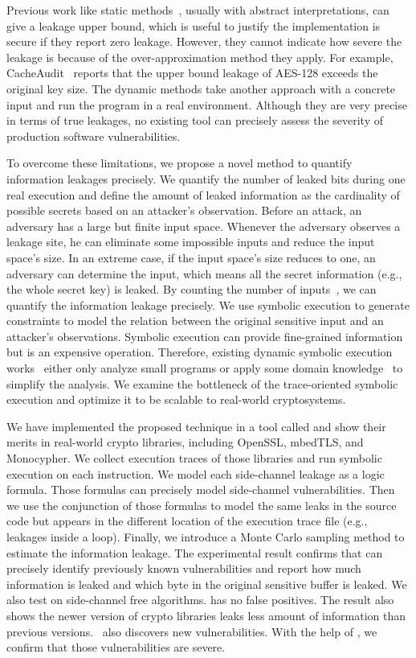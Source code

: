Previous work like static methods~\cite{182946,5207642}, usually with
abstract interpretations, can give a leakage upper bound, which is useful to
justify the implementation is secure if they report zero leakage.
However, they cannot indicate how severe the leakage is because of the
over-approximation method they apply. For example, CacheAudit~\cite{182946} 
reports that the upper bound leakage of AES-128 exceeds the original key size. The dynamic methods take
another approach with a concrete input and run the program in a real
environment. Although they are very precise in terms of true leakages, no
existing tool can precisely assess the severity of production
software vulnerabilities. 

To overcome these limitations, we propose a novel method to quantify information 
leakages precisely. We quantify the number of leaked bits during one real 
execution and define the amount of leaked information as the cardinality of 
possible secrets based on an attacker's observation. Before an attack, an adversary has a large but finite input space. 
Whenever the adversary observes a leakage site, he can eliminate some impossible 
inputs and reduce the input space's size. In an extreme case, if the input space's size 
reduces to one, an adversary can determine the input, 
which means all the secret information (e.g., the whole secret key) is
leaked. By counting the number of inputs~\cite{10.1007/11499107_24}, 
we can quantify the information leakage precisely.
We use symbolic execution to generate constraints to model the relation 
between the original sensitive input and an attacker's observations. 
Symbolic execution can provide fine-grained information but is an expensive
operation. Therefore, existing dynamic symbolic
execution works~\cite{203878,236338,Brotzman19Casym} either only analyze
small programs or apply some domain knowledge~\cite{203878} to simplify the analysis. We
examine the bottleneck of the trace-oriented symbolic execution and optimize it
to be scalable to real-world cryptosystems.

We have implemented the proposed technique in a tool called \tool{} and show 
their merits in real-world crypto libraries, including OpenSSL, 
mbedTLS, and Monocypher.
We collect execution traces of those libraries and run 
symbolic execution on each instruction. We model
each side-channel leakage as a logic formula. Those
formulas can precisely model side-channel vulnerabilities. 
Then we use the conjunction of those formulas to model the 
same leaks in the source code but appears in the different location of
the execution trace file (e.g., leakages inside a loop).
Finally, we introduce a Monte Carlo sampling method to estimate 
the information leakage. 
The experimental result confirms
that \tool{} can precisely identify previously known vulnerabilities and 
report how much information is leaked and which byte in the original sensitive 
buffer is leaked. We also test \tool{} on side-channel free algorithms. 
\tool{} has no false positives.
The result also shows the newer version of crypto libraries leaks less amount of information 
than previous versions.
\tool\ also discovers new vulnerabilities. With the help of \tool{}, 
we confirm that those vulnerabilities are severe.


